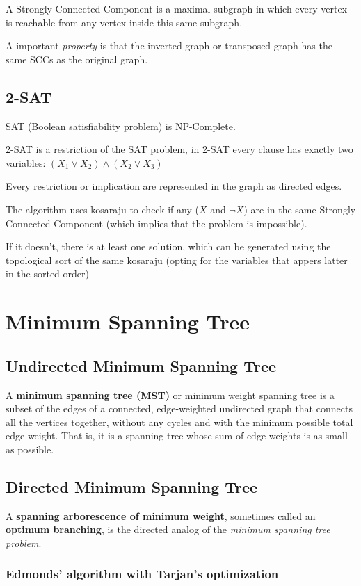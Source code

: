 	A Strongly Connected Component is a maximal subgraph in which every vertex is reachable
	from any vertex inside this same subgraph.

	A important \textit{property} is that the inverted graph or transposed graph has the same SCCs
	as the original graph.


\subsection{2-SAT}
	
		SAT (Boolean satisfiability problem) is NP-Complete.

		2-SAT is a restriction of the SAT problem, in 2-SAT every clause has exactly two variables:
		$ (X_1 \vee X_2) \wedge (X_2 \vee X_3) $

		Every restriction or implication are represented in the graph as directed edges.

		The algorithm uses kosaraju to check if any ($X$ and $\neg{X}$) are in the same Strongly Connected Component 
		(which implies that the problem is impossible). 

		If it doesn't, there is at least one solution, which can be generated using the topological sort of the same kosaraju 
		(opting for the variables that appers latter in the sorted order)


\section{Minimum Spanning Tree}

\subsection{Undirected Minimum Spanning Tree}

	A \textbf{minimum spanning tree (MST)} or minimum weight spanning tree is a subset of the edges
	of a connected, edge-weighted undirected graph that connects all the vertices together,
	without any cycles and with the minimum possible total edge weight.
	That is, it is a spanning tree whose sum of edge weights is as small as possible.


\subsection{Directed Minimum Spanning Tree}

	A \textbf{spanning arborescence of minimum weight}, sometimes called an \textbf{optimum branching},
	is the directed analog of the \textit{minimum spanning tree problem}.

	\subsubsection{Edmonds' algorithm with Tarjan's optimization}

